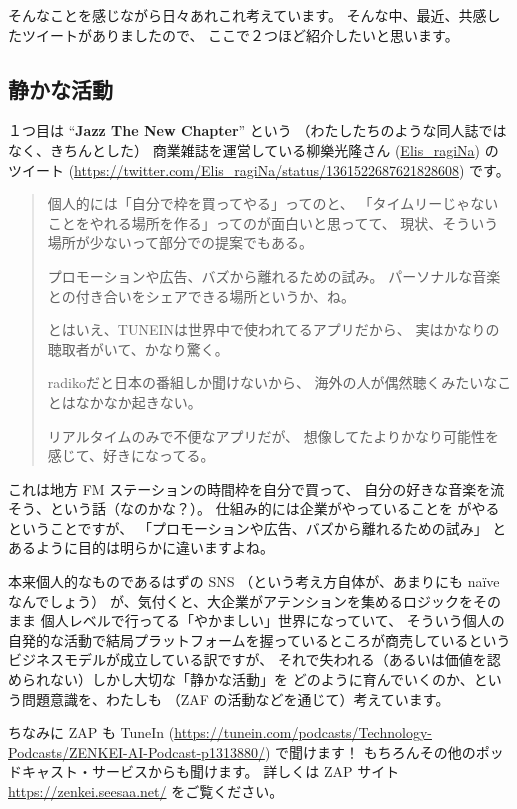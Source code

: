 \documentclass[dvipdfmx,autodetect-engine,10pt,b5paper,papersize,openany,dvipsnames]{jsbook}
\begin{document}
\begin{multicols}{2}
そんなことを感じながら日々あれこれ考えています。
そんな中、最近、共感したツイートがありましたので、
ここで２つほど紹介したいと思います。

\subsection{静かな活動}
１つ目は
``{\bfseries Jazz The New Chapter}'' という
（わたしたちのような同人誌ではなく、きちんとした）
商業雑誌を運営している柳樂光隆さん
(\href{https://twitter.com/Elis_ragiNa/}{Elis\_ragiNa})
のツイート
(\url{https://twitter.com/Elis_ragiNa/status/1361522687621828608})
です。
\begin{quotation}
  \noindent
  個人的には「自分で枠を買ってやる」ってのと、
  「タイムリーじゃないことをやれる場所を作る」ってのが面白いと思ってて、
  現状、そういう場所が少ないって部分での提案でもある。

  プロモーションや広告、バズから離れるための試み。
  パーソナルな音楽との付き合いをシェアできる場所というか、ね。

  とはいえ、TUNEINは世界中で使われてるアプリだから、
  実はかなりの聴取者がいて、かなり驚く。

  radikoだと日本の番組しか聞けないから、
  海外の人が偶然聴くみたいなことはなかなか起きない。

  リアルタイムのみで不便なアプリだが、
  想像してたよりかなり可能性を感じて、好きになってる。
\end{quotation}
これは地方 FM ステーションの時間枠を自分で買って、
自分の好きな音楽を流そう、という話（なのかな？）。
仕組み的には企業がやっていることを
がやるということですが、
「プロモーションや広告、バズから離れるための試み」
とあるように目的は明らかに違いますよね。

本来個人的なものであるはずの SNS
（という考え方自体が、あまりにも na\"{i}ve なんでしょう）
が、気付くと、大企業がアテンションを集めるロジックをそのまま
個人レベルで行ってる「やかましい」世界になっていて、
そういう個人の自発的な活動で結局プラットフォームを握っているところが商売しているという
ビジネスモデルが成立している訳ですが、
それで失われる（あるいは価値を認められない）しかし大切な「静かな活動」を
どのように育んでいくのか、という問題意識を、わたしも
（ZAF の活動などを通じて）考えています。
	  
ちなみに ZAP も TuneIn
(\url{https://tunein.com/podcasts/Technology-Podcasts/ZENKEI-AI-Podcast-p1313880/}) で聞けます！
もちろんその他のポッドキャスト・サービスからも聞けます。
詳しくは ZAP サイト \url{https://zenkei.seesaa.net/} をご覧ください。



\end{multicols}
\end{document}
